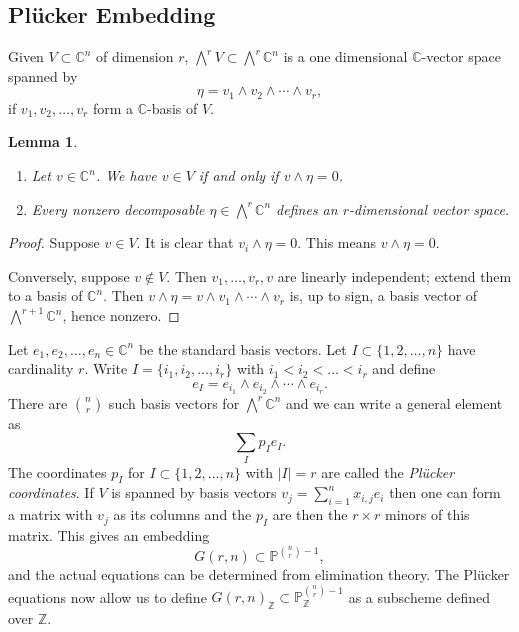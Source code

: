 \documentclass[12pt]{article}
\numberwithin{equation}{section}
\newtheorem{lemma}[theorem]{Lemma}
\theoremstyle{definition}
\theoremstyle{remark}
\newcommand{\CC}{\mathbb{C}}
\newcommand{\ZZ}{\mathbb{Z}}
\newcommand{\PP}{\mathbb{P}}
\begin{document}
\subsection{Pl\"{u}cker Embedding}
Given $V \subset \CC^n$ of dimension $r$, $\bigwedge^rV \subset \bigwedge^r \CC^n$ is a one dimensional $\CC$-vector space spanned by 
$$\eta=v_1\wedge v_2 \wedge \cdots \wedge v_r,$$ 
if $v_1,v_2,\ldots, v_r$ form a $\CC$-basis of $V$. 
\begin{lemma}
	\begin{enumerate}
		\item Let $v\in \CC^n$. We have $v\in V$ if and only if $v\wedge \eta =0$.
		\item Every nonzero decomposable $\eta \in \bigwedge^r\CC^n$ defines an $r$-dimensional vector space. 
	\end{enumerate}
\end{lemma}
\begin{proof}
	Suppose $v\in V$. 
	It is clear that $v_i\wedge \eta=0$. 
	This means $v\wedge \eta=0$. 
	
	Conversely, suppose $v\notin V$. Then $v_1,\ldots,v_r,v$ are linearly independent; extend them to a basis of $\CC^n$.
	Then $v\wedge \eta = v\wedge v_1\wedge\cdots\wedge v_r$ is, up to sign, a basis vector of $\bigwedge^{r+1}\CC^n$, hence nonzero.
\end{proof}
Let $e_1,e_2,\ldots, e_n \in \CC^n$ be the standard basis vectors. 
Let $I\subset \lbrace 1,2,\ldots, n \rbrace$ have cardinality $r$. 
Write $I = \lbrace i_1,i_2,\ldots, i_r \rbrace$ with $i_1<i_2<\ldots<i_r$ and define
$$ e_I = e_{i_1}\wedge e_{i_2} \wedge \cdots \wedge e_{i_r}. $$
There are ${n \choose r}$ such basis vectors for $\bigwedge^r\CC^n$ and we can write a general element as 
$$ \sum_{I}p_I e_I. $$
The coordinates $p_I$ for $I\subset \lbrace 1,2,\ldots,n\rbrace$ with $|I|=r$ are called the \emph{Pl\"{u}cker coordinates}.
If $V$ is spanned by basis vectors $v_j = \sum_{i=1}^n x_{i,j}e_i$ then one can form a matrix with $v_j$ as its columns and the $p_I$ are then the $r\times r$ minors of this matrix.
This gives an embedding 
$$ G(r,n) \subset \PP^{{n \choose r} -1}, $$
and the actual equations can be determined from elimination theory. 
The Pl\"{u}cker equations now allow us to define $G(r,n)_{\ZZ} \subset \PP^{{n \choose r} -1}_{\ZZ}$ as a subscheme defined over $\ZZ$.  
\end{document}
